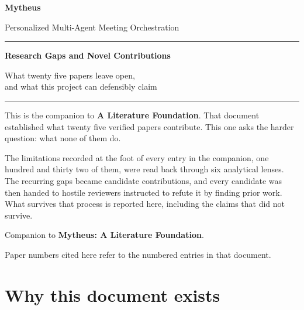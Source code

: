 \begin{titlepage}
\centering
\vspace*{2.2cm}

{\LARGE\bfseries Mytheus\par}
\vspace{0.5em}
{\large Personalized Multi-Agent Meeting Orchestration\par}

\vspace{1.6cm}
{\color{rulegrey}\hrule}
\vspace{1.1cm}

{\Large\bfseries Research Gaps and Novel Contributions\par}
\vspace{0.5em}
{\large What twenty five papers leave open,\\ and what this project can defensibly claim\par}

\vspace{1.1cm}
{\color{rulegrey}\hrule}
\vspace{2.0cm}

\begin{minipage}{0.82\textwidth}
\small
This is the companion to \textbf{A Literature Foundation}. That document
established what twenty five verified papers contribute. This one asks the
harder question: what none of them do.

\vspace{0.7em}
The limitations recorded at the foot of every entry in the companion, one
hundred and thirty two of them, were read back through six analytical lenses.
The recurring gaps became candidate contributions, and every candidate was
then handed to hostile reviewers instructed to refute it by finding prior
work. What survives that process is reported here, including the claims that
did not survive.
\end{minipage}

\vfill
{\footnotesize\color{rulegrey}
Companion to \textbf{Mytheus: A Literature Foundation}.\par
Paper numbers cited here refer to the numbered entries in that document.\par}
\vspace{1cm}
\end{titlepage}

\section*{Why this document exists}

